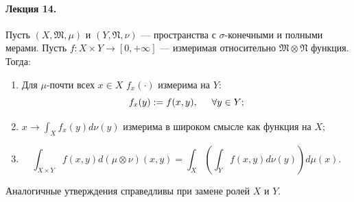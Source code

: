 \paragraph{Лекция 14.}

\begin{theorem}[Тонелли]
    Пусть $(X, \mathfrak{M}, \mu)$ и $(Y, \mathfrak{N}, \nu)$ — пространства с $\sigma$-конечными и полными мерами.
    Пусть $f: X \times Y \to [0, +\infty]$ — измеримая относительно $\mathfrak{M} \otimes \mathfrak{N}$ функция.
    Тогда:
    \begin{enumerate}
        \item Для $\mu$-почти всех $x \in X$ $f_x(\cdot)$ измерима на $Y$:
        \[f_x(y):=f(x,y), \hspace*{.5cm} \forall y \in Y;\]
        \item $x \to \int_X f_x(y) d\nu(y)$ измерима в широком смысле как функция на $X$;
        \item \[\int_{X \times Y} f(x,y)d(\mu \otimes \nu)(x,y) = \int_X \left(\int_Y f(x,y)d\nu(y)\right)d\mu(x).\]
    \end{enumerate}
    Аналогичные утверждения справедливы при замене ролей $X$ и $Y$.
\end{theorem} 
